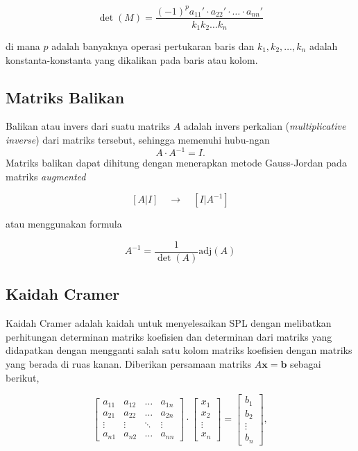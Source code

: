         \[
            \det(M) = \frac{(-1)^p a_{11}' \cdot a_{22}' \cdot \ldots \cdot a_{nn}'}{k_1 k_2 \ldots k_n}
        \]

        di mana $p$ adalah banyaknya operasi pertukaran baris dan $k_1, k_2, \ldots, k_n$ adalah konstanta-konstanta yang dikalikan pada baris atau kolom.
        
    
\subsection{Matriks Balikan}
Balikan atau invers dari suatu matriks $A$ adalah invers perkalian (\textit{multiplicative inverse}) dari matriks tersebut, sehingga memenuhi hubu-\linebreak ngan
\[ A \cdot A^{-1} = I. \]
Matriks balikan dapat dihitung dengan menerapkan metode Gauss-Jordan pada matriks \textit{augmented}

\[ \left[A | I\right] \quad \to \quad \left[I | A^{-1}\right] \]

atau menggunakan formula

\[ A^{-1} = \frac{1}{\det(A)} \mathrm{adj}(A) \]

\subsection{Kaidah Cramer} 

Kaidah Cramer adalah kaidah untuk menyelesaikan SPL dengan melibatkan perhitungan determinan matriks koefisien dan determinan dari matriks yang didapatkan dengan mengganti salah satu kolom matriks koefisien dengan matriks yang berada di ruas kanan. Diberikan persamaan matriks $A \textbf{x} = \textbf{b}$ sebagai berikut,

\[
    \begin{bmatrix}
        a_{11} & a_{12} & \ldots & a_{1n} \\
        a_{21} & a_{22} & \ldots & a_{2n} \\
        \vdots & \vdots & \ddots & \vdots \\
        a_{n1} & a_{n2} & \ldots & a_{nn} 
    \end{bmatrix} \cdot 
    \begin{bmatrix}
        x_1\\
        x_2\\
        \vdots\\
        x_n
    \end{bmatrix}
    =
    \begin{bmatrix}
        b_1\\
        b_2\\
        \vdots\\
        b_n
    \end{bmatrix},
\]

